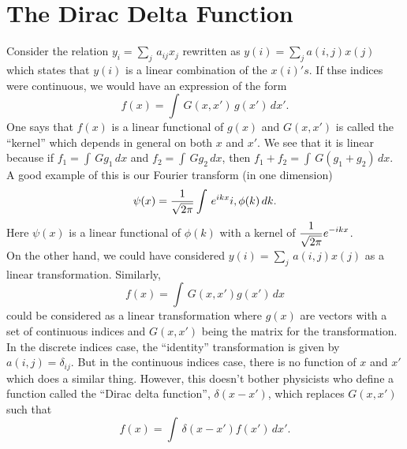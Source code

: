 \section{The Dirac Delta Function}
Consider the relation $\displaystyle y_i = \sum_j \, a_{ij} x_j$ rewritten as $\displaystyle y(i) = \sum_j a(i,j) x(j)$ which states that $y(i)$ is a linear combination of the $x(i)'s$.
If thse indices were continuous, we would have an expression of the form
$$f(x) = \int\, G(x,x') \, g(x') \, dx'.$$ One says that $f(x)$ is a linear functional of $g(x)$ and $G(x,x')$ is called the ``kernel'' which depends in general on both $x$ and $x'$. We see that it is linear
because if $f_1 = \int\, G g_1\,dx$ and $f_2 = \int\, G g_2\,dx$, then $f_1 + f_2 = \int\, G(g_1 + g_2)\, dx$. A good example of this is our Fourier transform (in one dimension)
$$\psi(x) = {1\over \sqrt{2\pi}}\int\, e^{ikx}i, \phi(k)\, dk.$$ Here $\psi(x)$ is a linear functional of $\phi(k)$ with a kernel of $\displaystyle {1\over\sqrt{2\pi}}e^{-ikx}$. \\
On the other hand, we could have considered $\displaystyle y(i) = \sum_j\, a(i,j) x(j)$ as a linear transformation. Similarly, 
$$f(x) = \int\, G(x,x') g(x')\,dx$$ could be considered as a linear transformation where $g(x)$ are vectors with a set of continuous indices and $G(x,x')$ being the matrix for the transformation.\\
In the discrete indices case, the ``identity'' transformation is given by $a(i,j) = \delta_{ij}$. But in the continuous indices case, there is no function of $x$ and $x'$ which does a similar thing. However, 
this doesn't bother physicists who define a function called the ``Dirac delta function'', $\delta(x-x')$, which replaces $G(x,x')$ such that $$f(x) = \int \, \delta(x-x') f(x')\, dx'.$$ 

